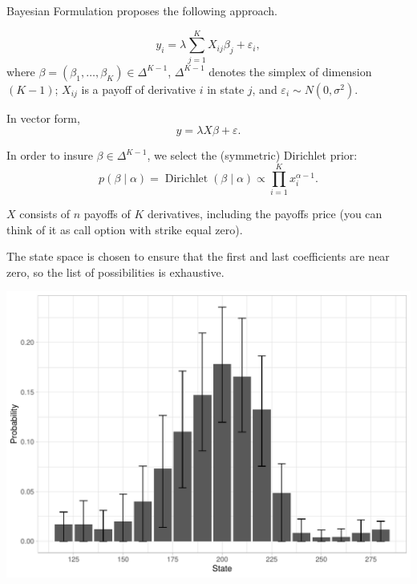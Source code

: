 \documentclass[10pt,aspectratio=43]{beamer}
\begin{document}
\begin{frame}{Bayesian Formulation}
    \cite{fisherSimplexRegression2016} proposes the following approach.

    \[y_i=\lambda\sum_{j=1}^KX_{ij}\beta_j+\varepsilon_i,\]
    where $\beta=(\beta_1,\dots, \beta_K)\in \Delta^{K-1}$, $\Delta^{K-1}$ denotes the simplex of dimension $(K-1)$; $X_{ij}$ is a payoff of derivative $i$ in state $j$, and $\varepsilon_i\sim N(0,\sigma^2)$.

    In vector form,
    \[y=\lambda X \beta+\varepsilon.\]

    In order to insure $\beta\in \Delta^{K-1}$, we select the (symmetric) Dirichlet prior:
    \[p(\beta\mid \alpha)=\operatorname{Dirichlet}(\beta\mid \alpha)\propto \prod_{i=1}^{K}x_{i}^{\alpha-1}.\]

\end{frame}

\begin{frame}{}
$X$ consists of $n$ payoffs of $K$ derivatives, including the payoffs price (you can think of it as call option with strike equal zero).

The state space is chosen to ensure that the first and last coefficients are near zero, so the list of possibilities is exhaustive.
 \begin{center}
        \includegraphics[width=0.6\linewidth]{betas_23_3.pdf}
    \end{center}

\end{frame}
\end{document}
